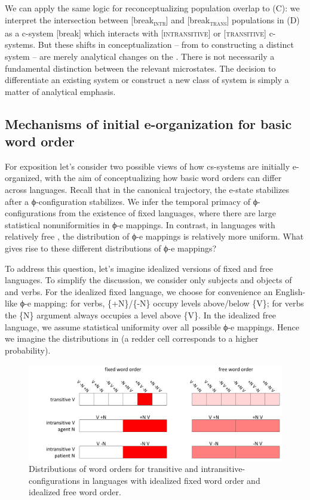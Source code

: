  We can apply the same logic for reconceptualizing population overlap to (C): we interpret the intersection between [break\textsubscript{\textsc{intr}}] and [break\textsubscript{\textsc{trans}}] populations in (D) as a c-system [break] which interacts with [\textsc{intransitive}] or [\textsc{transitive}] c-systems. But these shifts in conceptualization -- from  to constructing a distinct system -- are merely analytical changes on the . There is not necessarily a fundamental distinction between the relevant microstates. The  decision to differentiate an existing system or construct a new class of system is simply a matter of analytical emphasis.

\subsection{Mechanisms of initial e-organization for basic word order}

For exposition let's consider two possible views of how cs-systems are initially e-organized, with the aim of conceptualizing how basic word orders can differ across languages. Recall that in the canonical trajectory, the e-state stabilizes after a ϕ-configuration stabilizes. We infer the temporal primacy of ϕ-con\-fig\-u\-ra\-tions from the existence of fixed  languages, where there are large statistical nonuniformities in ϕ-e mappings. In contrast, in languages with relatively free , the distribution of ϕ-e mappings is relatively more uniform. What gives rise to these different distributions of ϕ-e mappings?

  To address this question, let's imagine idealized versions of fixed and free  languages. To simplify the discussion, we consider only subjects and objects of  and  verbs. For the idealized fixed  language, we choose for convenience an English-like ϕ-e mapping: for  verbs, \{+N\}/\{-N\} occupy levels above/below \{V\}; for  verbs the \{N\} argument always occupies a level above \{V\}. In the idealized free  language, we assume statistical uniformity over all possible ϕ-e mappings. Hence we imagine the distributions in {} (a redder cell corresponds to a higher probability).

  
\begin{figure}
\includegraphics[width=\textwidth]{figures/Tilsen-img74.png}
\caption{Distributions of word orders for transitive and intransitive-configurations in languages with idealized fixed word order and idealized free word order.}
\label{fig:4:24}
\end{figure}
 

